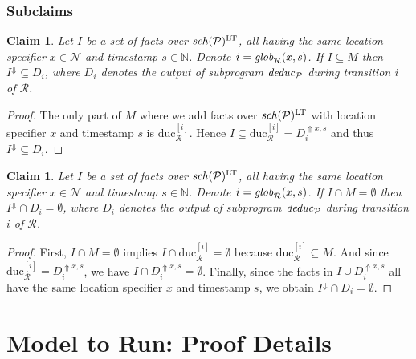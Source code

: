 \documentclass{tlp}
\newtheorem{claim}[theorem]{Claim}
\newcommand{\Nat}{\mathbb{N}}  \newcommand{\len}[1]{|#1|} \newcommand{\rom}[1]{\text{\emph{(#1)}}} \newcommand{\romI}{\rom i}
\newcommand{\ded}{\mathcal{P}}
\newcommand{\schof}[1]{\fname{sch}(#1)}
\newcommand{\nw}{\mathcal{N}}
\newcommand{\toloct}[1]{#1^{\mathrm{LT}}}
\newcommand{\addlt}[3]{#1^{\Uparrow#2,#3}}
\newcommand{\droplt}[1]{#1^{\Downarrow}}
\newcommand{\run}{\mathcal{R}}
\newcommand{\deduc}[1]{\fname{deduc}_{#1}}
\newcommand{\globR}[1]{\fname{glob}_{\run}(#1)}
\newcommand{\sliceduc}[1]{\text{duc}_{\run}^{[#1]}}
\begin{document}
\begin{appendix}
\subsubsection{Subclaims}

\label{sub:run-to-model-second-dir--claims}



\begin{claim}\label{claim:in-M-in-duc}Let $I$ be a set of facts
over $\toloct{\schof{\ded}}$, all having the same location specifier
$x\in\nw$ and timestamp $s\in\Nat$. Denote $i=\globR{x,s}$. If
$I\subseteq M$ then $\droplt I\subseteq D_{i}$, where $D_{i}$ denotes
the output of subprogram $\deduc{\ded}$ during transition $i$ of
$\run$.\end{claim}

\begin{proof}The only part of $M$ where we add facts over $\toloct{\schof{\ded}}$
with location specifier $x$ and timestamp $s$ is $\sliceduc i$.
Hence $I\subseteq\sliceduc i=\addlt{D_{i}}xs$ and thus $\droplt I\subseteq D_{i}$.\end{proof}



\tline



\begin{claim}\label{claim:not-in-M-not-in-duc}Let $I$ be a set
of facts over $\toloct{\schof{\ded}}$, all having the same location
specifier $x\in\nw$ and timestamp $s\in\Nat$. Denote $i=\globR{x,s}$.
If $I\cap M=\emptyset$ then $\droplt I\cap D_{i}=\emptyset$, where
$D_{i}$ denotes the output of subprogram $\deduc{\ded}$ during transition
$i$ of $\run$.\end{claim}

\begin{proof}First, $I\cap M=\emptyset$ implies $I\cap\sliceduc i=\emptyset$
because $\sliceduc i\subseteq M$. And since $\sliceduc i=\addlt{D_{i}}xs$,
we have $I\cap\addlt{D_{i}}xs=\emptyset$. Finally, since the facts
in $I\cup\addlt{D_{i}}xs$ all have the same location specifier $x$
and timestamp $s$, we obtain $\droplt I\cap D_{i}=\emptyset$.\end{proof}


\section{Model to Run: Proof Details}

\label{app:proof-dir-2}


\end{appendix}
\end{document}
